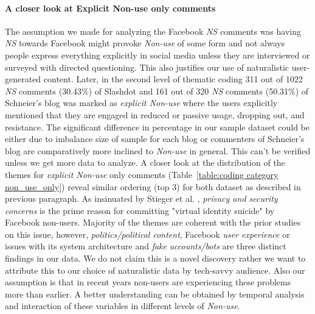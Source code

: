 \paragraph{A closer look at Explicit Non-use only comments}

The assumption we made for analyzing the Facebook \emph{NS} comments was having \emph{NS} towards Facebook might provoke \emph{Non-use} of some form and not always people express everything explicitly in social media unless they are interviewed or surveyed with directed questioning. This also justifies our use of naturalistic user-generated content. Later, in the second level of thematic coding 311 out of 1022 \emph{NS} comments (30.43\%) of Slashdot and 161 out of 320 \emph{NS} comments (50.31\%) of Schneier's blog was marked as \emph{explicit Non-use} where the users explicitly mentioned that they are engaged in reduced or passive usage, dropping out, and resistance. The significant difference in percentage in our sample dataset could be either due to imbalance size of sample for each blog or commenters of Schneier's blog are comparatively more inclined to \emph{Non-use} in general. This can't be verified unless we get more data to analyze. A closer look at the distribution of the themes for \emph{explicit Non-use} only comments (Table~\ref{table:coding category non_use_only}) reveal similar ordering (top 3) for both dataset as described in previous paragraph. As insinuated by Stieger et al. \cite{stieger2013commits}, \textit{privacy and security concerns} is the prime reason for committing "virtual identity suicide" by Facebook non-users. Majority of the themes are coherent with the prior studies \cite{lampe2013users, baumer2013limiting, baker2011their} on this issue, however, \textit{politics/political content}, Facebook \textit{user experience} or issues with its system architecture and \textit{fake accounts/bots} are three distinct findings in our data. We do not claim this is a novel discovery rather we want to attribute this to our choice of naturalistic data by tech-savvy audience. Also our assumption is that in recent years non-users are experiencing these problems more than earlier. A better understanding can be obtained by temporal analysis and interaction of these variables in different levels of \textit{Non-use}.

